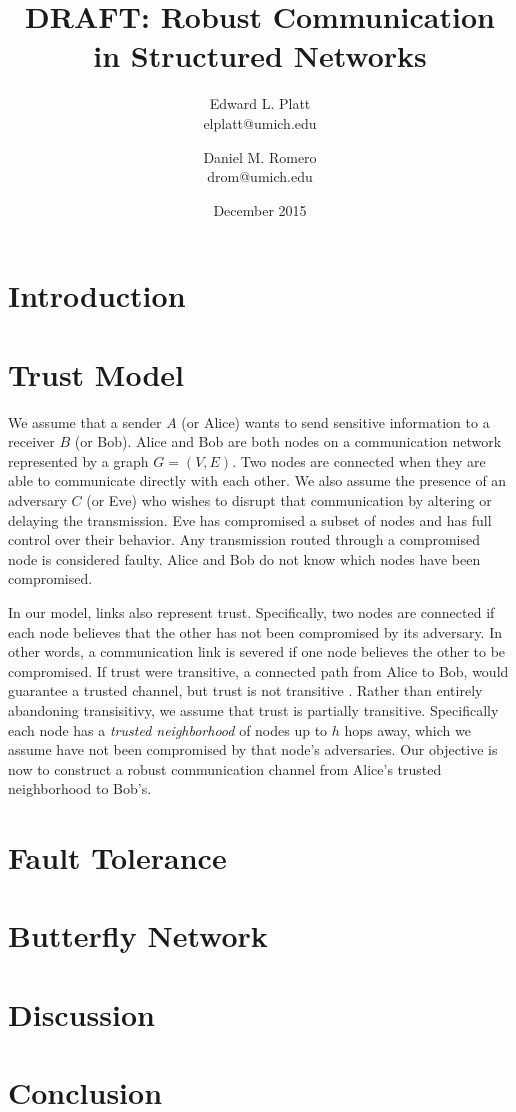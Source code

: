 \documentclass[twocolumn]{article}
\title{DRAFT: Robust Communication in Structured Networks}
\author{
    Edward L. Platt\\
    elplatt@umich.edu
    \and
    Daniel M. Romero\\
    drom@umich.edu
}
\date{December 2015}
\begin{document}
\maketitle

\section{Introduction}

\section{Trust Model}

We assume that a sender $A$ (or Alice) wants to send sensitive information
to a receiver $B$ (or Bob).
Alice and Bob are both nodes on a communication network represented by a graph
$G = (V, E)$.
Two nodes are connected when they are able to communicate directly with each
other.
We also assume the presence of an adversary $C$ (or Eve) who wishes to disrupt
that communication by altering or delaying the transmission.
Eve has compromised a subset of nodes and has full control over their behavior.
Any transmission routed through a compromised node is considered faulty.
Alice and Bob do not know which nodes have been compromised.

In our model, links also represent trust.
Specifically, two nodes are connected if each node believes that the other
has not been compromised by its adversary.
In other words, a communication link is severed if one node believes the other
to be compromised.
If trust were transitive, a connected path from Alice to Bob, would guarantee
a trusted channel, but trust is not transitive \cite{christianson_why_1997}.
Rather than entirely abandoning transisitivy, we assume that trust is
partially transitive.
Specifically each node has a {\em trusted neighborhood} of nodes up to $h$ hops
away, which we assume have not been compromised by that node's adversaries.
Our objective is now to construct a robust communication channel from Alice's
trusted neighborhood to Bob's.


\section{Fault Tolerance}

\section{Butterfly Network}

\section{Discussion}

\section{Conclusion}



\end{document}

